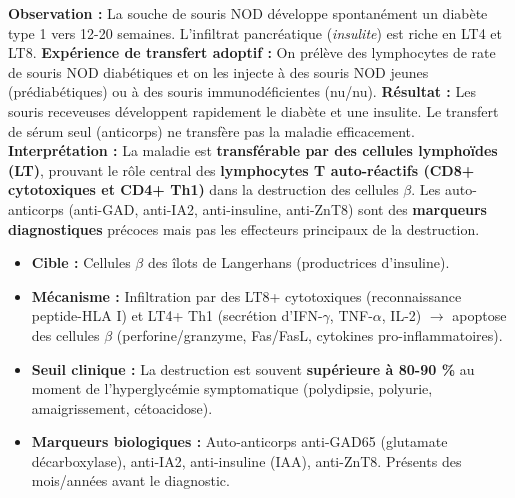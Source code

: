 \documentclass[11pt]{article}
\begin{document}
\begin{experience}
\textbf{Observation :} La souche de souris NOD développe spontanément un diabète type 1 vers 12-20 semaines. L'infiltrat pancréatique (\emph{insulite}) est riche en LT4 et LT8.
\textbf{Expérience de transfert adoptif :} On prélève des lymphocytes de rate de souris NOD diabétiques et on les injecte à des souris NOD jeunes (prédiabétiques) ou à des souris immunodéficientes (nu/nu).
\textbf{Résultat :} Les souris receveuses développent rapidement le diabète et une insulite. Le transfert de sérum seul (anticorps) ne transfère pas la maladie efficacement.
\textbf{Interprétation :} La maladie est \textbf{transférable par des cellules lymphoïdes (LT)}, prouvant le rôle central des \textbf{lymphocytes T auto-réactifs (CD8+ cytotoxiques et CD4+ Th1)} dans la destruction des cellules $\beta$. Les auto-anticorps (anti-GAD, anti-IA2, anti-insuline, anti-ZnT8) sont des \textbf{marqueurs diagnostiques} précoces mais pas les effecteurs principaux de la destruction.
\end{experience}

\begin{propriete}
\begin{itemize}
    \item \textbf{Cible :} Cellules $\beta$ des îlots de Langerhans (productrices d'insuline).
    \item \textbf{Mécanisme :} Infiltration par des LT8+ cytotoxiques (reconnaissance peptide-HLA I) et LT4+ Th1 (secrétion d'IFN-$\gamma$, TNF-$\alpha$, IL-2) $\rightarrow$ apoptose des cellules $\beta$ (perforine/granzyme, Fas/FasL, cytokines pro-inflammatoires).
    \item \textbf{Seuil clinique :} La destruction est souvent \textbf{supérieure à 80-90 \%} au moment de l'hyperglycémie symptomatique (polydipsie, polyurie, amaigrissement, cétoacidose).
    \item \textbf{Marqueurs biologiques :} Auto-anticorps anti-GAD65 (glutamate décarboxylase), anti-IA2, anti-insuline (IAA), anti-ZnT8. Présents des mois/années avant le diagnostic.
\end{itemize}
\end{propriete}
\end{document}
